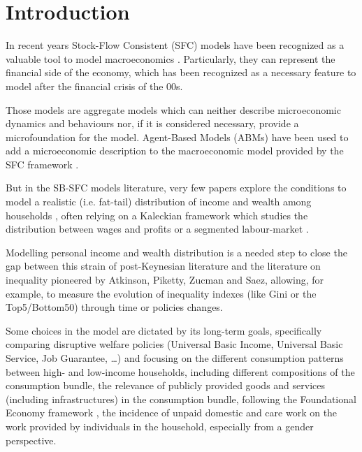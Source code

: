 \documentclass[a4paper, headings=standardclasses]{scrartcl}
\begin{document}
\section{Introduction}

In recent years Stock-Flow Consistent (SFC) models have been recognized as a valuable tool to model macroeconomics \parencite{nikiforos2017}. Particularly, they can represent the financial side of the economy, which has been recognized as a necessary feature to model after the financial crisis of the 00s.

Those models are aggregate models which can neither describe microeconomic dynamics and behaviours nor, if it is considered necessary, provide a microfoundation for the model.
Agent-Based Models (ABMs) have been used to add a microeconomic description to the macroeconomic model provided by the SFC framework \parencite{caverzasi2018,dosi2019}.

But in the SB-SFC models literature, very few papers explore the conditions to model a realistic (i.e. fat-tail) distribution of income and wealth among households \parencite[e.g.][]{dafermos2015,kinsella2011}, often relying on a Kaleckian framework which studies the distribution between wages and profits \parencite[e.g.][]{dosi2013a} or a segmented labour-market \parencite[e.g.][]{caiani2019a}.

Modelling personal income and wealth distribution is a needed step to close the gap between this strain of post-Keynesian literature and the literature on inequality pioneered by Atkinson, Piketty, Zucman and Saez, allowing, for example, to measure the evolution of inequality indexes (like Gini or the Top5/Bottom50) through time or policies changes.

Some choices in the model are dictated by its long-term goals, specifically comparing disruptive welfare policies (Universal Basic Income, Universal Basic Service, Job Guarantee, \dots) and focusing on the different consumption patterns between high- and low-income households, including different compositions of the consumption bundle, the relevance of publicly provided goods and services (including infrastructures) in the consumption bundle, following the Foundational Economy framework \parencite{arcidiacono2018}, the incidence of unpaid domestic and care work on the work provided by individuals in the household, especially from a gender perspective.
\end{document}
